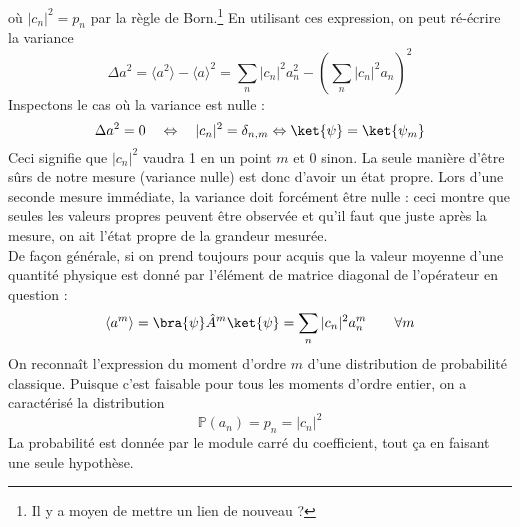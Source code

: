  où $|c_n|^2 = p_n$ par la règle de Born.\footnote{Il y a moyen de mettre un lien de nouveau ?}
 En utilisant ces expression, on peut ré-écrire la variance
 \begin{equation}
 \Delta a^2 = \langle a^2\rangle - \langle a\rangle^2 = \sum_n |c_n|^2 a_n^2 - 
 \left(\sum_n |c_n|^2 a_n\right)^2
 \end{equation}
 Inspectons le cas où la variance est nulle :
 \begin{equation}
 \Delta a^2 = 0\quad \Leftrightarrow\quad |c_n|^2 = \delta_{n,m} \Leftrightarrow
 \ket{\psi} = \ket{\psi_m}
 \end{equation}
 Ceci signifie que $|c_n|^2$ vaudra 1 en un point $m$ et 0 sinon.
 La seule manière d'être sûrs de notre mesure (variance nulle) est donc 
 d'avoir un état propre.
 Lors d'une seconde mesure immédiate, la variance doit forcément être nulle : ceci montre que seules 
 les valeurs propres peuvent être observée et qu'il faut que juste après la 
 mesure, on ait l'état propre de la grandeur mesurée.\\
 
 De façon générale, si on prend toujours pour acquis que la valeur moyenne 
 d'une quantité physique est donné par l'élément de matrice diagonal 
 de l'opérateur en question :
 \begin{equation}
 \langle a^m\rangle = \bra{\psi}\hat{A}^m\ket{\psi} = \sum_n |c_n|^2 a_n^m\qquad
  \forall m
 \end{equation}
 On reconnaît l'expression du moment d'ordre $m$ d'une distribution de probabilité 
 classique. 
 Puisque c'est faisable pour tous les moments d'ordre entier, on a caractérisé la distribution
 \begin{equation}
 \mathbb{P}(a_n) = p_n = |c_n|^2
 \end{equation}
 La probabilité est donnée par le module carré du coefficient, tout ça 
 en faisant une seule hypothèse.
  
